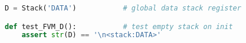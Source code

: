 \clearpage{}\label{Dstack}

\begin{lstlisting}[language=Python]
D = Stack('DATA')			# global data stack register

def test_FVM_D():			# test empty stack on init
	assert str(D) == '\n<stack:DATA>'
\end{lstlisting}
